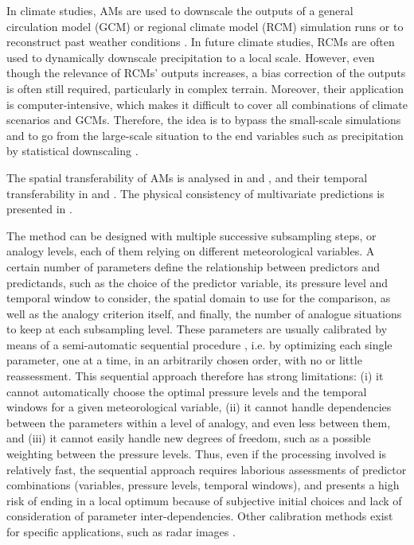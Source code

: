 \documentclass[review]{elsarticle}
\begin{document}
In climate studies, AMs are used to downscale the outputs of a general circulation model (GCM) or regional climate model (RCM) simulation runs \citep{Dayon2015} or to reconstruct past weather conditions \citep{Caillouet2016}. In future climate studies, RCMs are often used to dynamically downscale precipitation to a local scale. However, even though the relevance of RCMs' outputs increases, a bias correction of the outputs is often still required, particularly in complex terrain. Moreover, their application is computer-intensive, which makes it difficult to cover all combinations of climate scenarios and GCMs. Therefore, the idea is to bypass the small-scale simulations and to go from the large-scale situation to the end variables such as precipitation by statistical downscaling \citep{Maraun2010}. 

The spatial transferability of AMs is analysed in \citet{Chardon2014} and \citet{Radanovics2013}, and their temporal transferability in \citet{Dayon2015} and \citet{Caillouet2016}. The physical consistency of multivariate predictions is presented in  \citet{Raynaud2016b}.

The method can be designed with multiple successive subsampling steps, or analogy levels, each of them relying on different meteorological variables. A certain number of parameters define the relationship between predictors and predictands, such as the choice of the predictor variable, its pressure level and temporal window to consider, the spatial domain to use for the comparison, as well as the analogy criterion itself, and finally, the number of analogue situations to keep at each subsampling level. These parameters are usually calibrated by means of a semi-automatic sequential procedure \citep{Bontron2004, Radanovics2013}, i.e. by optimizing each single parameter, one at a time, in an arbitrarily chosen order, with no or little reassessment. This sequential approach therefore has strong limitations: (i) it cannot automatically choose the optimal pressure levels and the temporal windows for a given meteorological variable, (ii) it cannot handle dependencies between the parameters within a level of analogy, and even less between them, and (iii) it cannot easily handle new degrees of freedom, such as a possible weighting between the pressure levels. Thus, even if the processing involved is relatively fast, the sequential approach requires laborious assessments of predictor combinations (variables, pressure levels, temporal windows), and presents a high risk of ending in a local optimum because of subjective initial choices and lack of consideration of parameter inter-dependencies. Other calibration methods exist for specific applications, such as radar images \citep{Panziera2011, Foresti2015a}.
\end{document}
